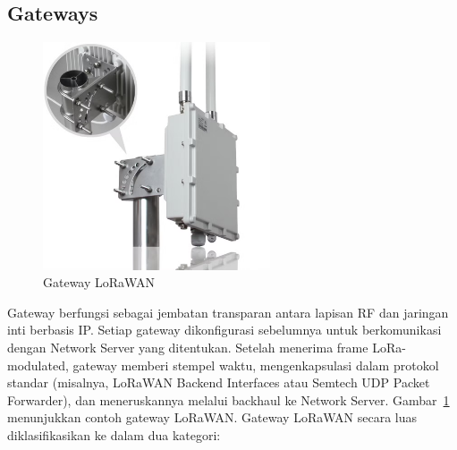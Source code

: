 \subsection{Gateways}
\begin{figure}
    \centering
    \includegraphics[width=0.6\textwidth]{figures/Ethernet-4G-Lorawan-Outdoor-Gateway-for-Remote-Street-Light-Management.png}
    \caption{Gateway LoRaWAN}
    \label{fig:lora_gateway}
\end{figure}
Gateway berfungsi sebagai jembatan transparan antara lapisan RF dan jaringan inti berbasis IP. Setiap gateway dikonfigurasi sebelumnya untuk berkomunikasi dengan Network Server yang ditentukan. Setelah menerima frame LoRa-modulated, gateway memberi stempel waktu, mengenkapsulasi dalam protokol standar (misalnya, LoRaWAN Backend Interfaces atau Semtech UDP Packet Forwarder), dan meneruskannya melalui backhaul ke Network Server.
Gambar~\ref{fig:lora_gateway} menunjukkan contoh gateway LoRaWAN.
Gateway LoRaWAN secara luas diklasifikasikan ke dalam dua kategori:
